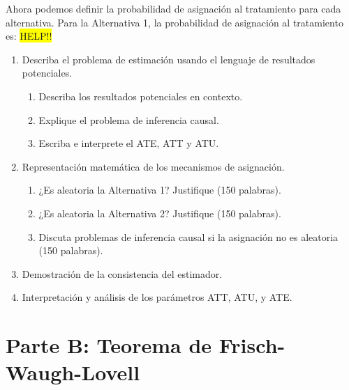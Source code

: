 \documentclass[12pt, letter]{article}
\begin{document}

Ahora podemos definir la probabilidad de asignación al tratamiento para cada alternativa. Para la Alternativa 1, la probabilidad de asignación al tratamiento es:
\colorbox{yellow}{HELP!!}



\begin{enumerate}[label=A.\arabic*]
    \item Describa el problema de estimación usando el lenguaje de resultados potenciales.
    \begin{enumerate}[label=A.1.\alph*]
        \item Describa los resultados potenciales en contexto.
        \item Explique el problema de inferencia causal.
        \item Escriba e interprete el ATE, ATT y ATU.
    \end{enumerate}


    \item Representación matemática de los mecanismos de asignación.
    \begin{enumerate}[label=A.2.\alph*]
        \item ¿Es aleatoria la Alternativa 1? Justifique (150 palabras).
        \item ¿Es aleatoria la Alternativa 2? Justifique (150 palabras).
        \item Discuta problemas de inferencia causal si la asignación no es aleatoria (150 palabras).
    \end{enumerate}
    \item Demostración de la consistencia del estimador.
    \item Interpretación y análisis de los parámetros ATT, ATU, y ATE.
\end{enumerate}







                                 
                                
\section{Parte B: Teorema de Frisch-Waugh-Lovell}
\end{document}
